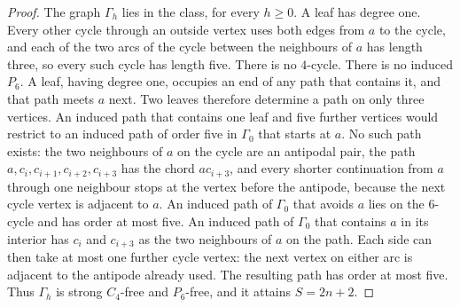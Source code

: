 \documentclass[ASNA]{USG}
\theoremstyle{WBstyletwo}
\numberwithin{equation}{section}
\begin{document}
\begin{proof}
The graph $\Gamma_h$ lies in the class, for every $h\ge 0$. A leaf has degree one. Every other cycle through an outside vertex uses both edges from $a$ to the cycle, and each of the two arcs of the cycle between the neighbours of $a$ has length three, so every such cycle has length five. There is no $4$-cycle. There is no induced $P_6$. A leaf, having degree one, occupies an end of any path that contains it, and that path meets $a$ next. Two leaves therefore determine a path on only three vertices. An induced path that contains one leaf and five further vertices would restrict to an induced path of order five in $\Gamma_0$ that starts at $a$. No such path exists: the two neighbours of $a$ on the cycle are an antipodal pair, the path $a,c_i,c_{i+1},c_{i+2},c_{i+3}$ has the chord $ac_{i+3}$, and every shorter continuation from $a$ through one neighbour stops at the vertex before the antipode, because the next cycle vertex is adjacent to $a$. An induced path of $\Gamma_0$ that avoids $a$ lies on the $6$-cycle and has order at most five. An induced path of $\Gamma_0$ that contains $a$ in its interior has $c_i$ and $c_{i+3}$ as the two neighbours of $a$ on the path. Each side can then take at most one further cycle vertex: the next vertex on either arc is adjacent to the antipode already used. The resulting path has order at most five. Thus $\Gamma_h$ is strong $C_4$-free and $P_6$-free, and it attains $S=2n+2$.


\end{proof}
\end{document}

